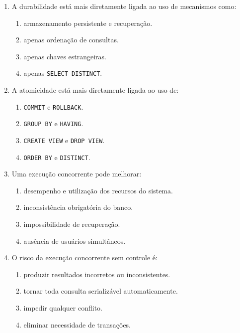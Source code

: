 \documentclass[12pt,a4paper]{article}
\begin{document}
\begin{enumerate}[label=\textbf{Q\arabic*.}]
\item A durabilidade está mais diretamente ligada ao uso de mecanismos como:

\begin{enumerate}[label=\alph*)]
    \item armazenamento persistente e recuperação.
    \item apenas ordenação de consultas.
    \item apenas chaves estrangeiras.
    \item apenas \texttt{SELECT DISTINCT}.
\end{enumerate}

\item A atomicidade está mais diretamente ligada ao uso de:

\begin{enumerate}[label=\alph*)]
    \item \texttt{COMMIT} e \texttt{ROLLBACK}.
    \item \texttt{GROUP BY} e \texttt{HAVING}.
    \item \texttt{CREATE VIEW} e \texttt{DROP VIEW}.
    \item \texttt{ORDER BY} e \texttt{DISTINCT}.
\end{enumerate}

\item Uma execução concorrente pode melhorar:

\begin{enumerate}[label=\alph*)]
    \item desempenho e utilização dos recursos do sistema.
    \item inconsistência obrigatória do banco.
    \item impossibilidade de recuperação.
    \item ausência de usuários simultâneos.
\end{enumerate}

\item O risco da execução concorrente sem controle é:

\begin{enumerate}[label=\alph*)]
    \item produzir resultados incorretos ou inconsistentes.
    \item tornar toda consulta serializável automaticamente.
    \item impedir qualquer conflito.
    \item eliminar necessidade de transações.
\end{enumerate}


\end{enumerate}
\end{document}
